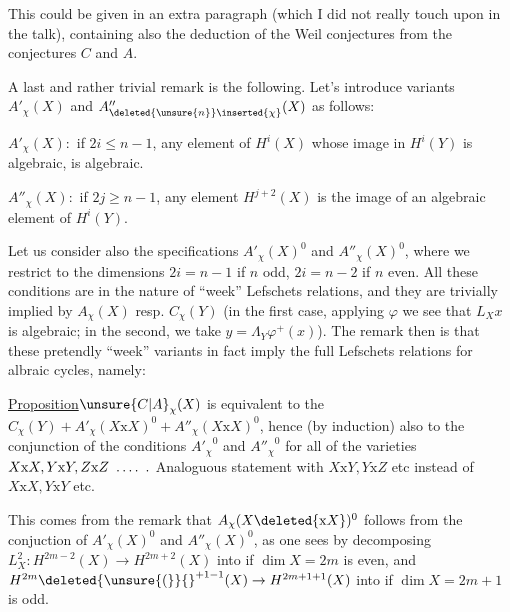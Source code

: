 

This could be given in an extra paragraph (which I did not really touch upon in the talk), containing also the deduction of the Weil conjectures from the conjectures $C$ and $A$.

A last and rather trivial remark is the following. Let's introduce  variants $A'_{\chi}(X)$ and $A''_{\deleted{\unsure{n}}\inserted{\chi}}(X)$ as follows:

$A'_{\chi}(X):$ if $2i\leq n-1$, any element  of $H^i(X)$ whose image in $H^i(Y)$ is algebraic, is algebraic.

$A''_{\chi}(X):$ if $2j\geq n-1$, any  element   $H^{j+2}(X)$ is  the image of an algebraic element of $H^i(Y)$.

Let us consider also the specifications $A'_{\chi}(X)^0$ and $A''_{\chi}(X)^0$, where we restrict to the  dimensions $2i=n-1$ if $n$ odd, $2i=n-2$ if $n$ even. All these conditions are in the nature of ``week'' Lefschets relations, and they are trivially implied by $A_{\chi}(X)$ resp. $C_{\chi}(Y)$ (in the first case, applying $\varphi$ we see that $L_Xx$ is algebraic; in the second, we take $y=\Lambda_Y\varphi^{+}(x)$). The remark then is that these pretendly ``week'' variants in fact imply the full Lefschets relations for albraic cycles, namely:

\uline{Proposition}\quad $\unsure{C|A}_{\chi}(X)$ is equivalent to the  $C_{\chi}(Y)+A'_{\chi}(X\mathrm{x} X)^0+A''_{\chi}(X\mathrm{x} X)^0$, hence (by induction) also to the conjunction of the conditions ${A'_{\chi}}^0$ and ${A''_{\chi}}^0$ for all of the varieties $X\mathrm{x} X,Y\mathrm{x} Y,Z\mathrm{x} Z\ \mathinner{\ldotp\ldotp\ldotp\ldotp}\ .$ Analoguous statement with $X\mathrm{x} Y,Y\mathrm{x} Z$ etc instead of $X\mathrm{x} X,Y\mathrm{x} Y$ etc.

This comes from the remark that  $A_{\chi}(X\deleted{\mathrm{x} X})^0$ follows from the conjuction of $A'_{\chi}(X)^0$ and $A''_{\chi}(X)^0$, as one sees by decomposing $L_X^2:H^{2m-2}(X)\to H^{2m+2}(X)$ into
if $\dim X=2m$ is even, and $H^{2m}\deleted{\unsure{(}}{}^{+1-1}(X)\to H^{2m+1+1}(X)$ into
if $\dim X=2m+1$ is odd.

